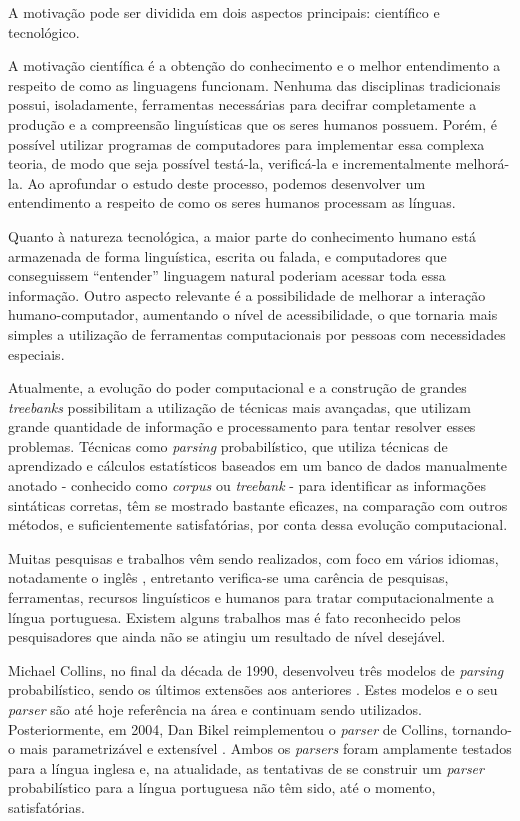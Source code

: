A motivação pode ser dividida em dois aspectos principais: científico e tecnológico.

A motivação científica é a obtenção do conhecimento e o melhor entendimento a respeito de como as linguagens funcionam. Nenhuma das disciplinas tradicionais possui, isoladamente, ferramentas necessárias para decifrar completamente a produção e a compreensão linguísticas que os seres humanos possuem. Porém, é possível utilizar programas de computadores para implementar essa complexa teoria, de modo que seja possível testá-la, verificá-la e incrementalmente melhorá-la. Ao aprofundar o estudo deste processo, podemos desenvolver um entendimento a respeito de como os seres humanos processam as línguas.

Quanto à natureza tecnológica, a maior parte do conhecimento humano está armazenada de forma linguística, escrita ou falada, e computadores que conseguissem ``entender'' linguagem natural poderiam acessar toda essa informação. Outro aspecto relevante é a possibilidade de melhorar a interação humano-computador, aumentando o nível de acessibilidade, o que tornaria mais simples a utilização de ferramentas computacionais por pessoas com necessidades especiais.

Atualmente, a evolução do poder computacional e a construção de grandes \emph{treebanks} possibilitam a utilização de técnicas mais avançadas, que utilizam grande quantidade de informação e processamento para tentar resolver esses problemas. Técnicas como \emph{parsing} probabilístico, que utiliza técnicas de aprendizado e cálculos estatísticos baseados em um banco de dados manualmente anotado - conhecido como \emph{corpus} ou \emph{treebank} - para identificar as informações sintáticas corretas, têm se mostrado bastante eficazes, na comparação com outros métodos, e suficientemente satisfatórias, por conta dessa evolução computacional.

Muitas pesquisas e trabalhos vêm sendo realizados, com foco em vários idiomas, notadamente o inglês \cite{prolo03,charniak97,collins97}, entretanto verifica-se uma carência de pesquisas, ferramentas, recursos linguísticos e humanos para tratar computacionalmente a língua portuguesa.
Existem alguns trabalhos \cite{baldridge06,bick00,bonfante03} mas é fato reconhecido pelos pesquisadores que ainda não se atingiu um resultado de nível desejável.

Michael Collins, no final da década de 1990, desenvolveu três modelos de \emph{parsing} probabilístico, sendo os últimos extensões aos anteriores \cite{collins99,collins97}. Estes modelos e o seu \emph{parser} são até hoje referência na área e continuam sendo utilizados. Posteriormente, em 2004, Dan Bikel reimplementou o \emph{parser} de Collins, tornando-o mais parametrizável e extensível \cite{bikel04}. Ambos os \emph{parsers} foram amplamente testados para a língua inglesa e, na atualidade, as tentativas de se construir um \emph{parser} probabilístico para a língua portuguesa não têm sido, até o momento, satisfatórias.



